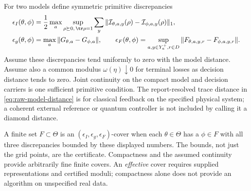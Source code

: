For two models define symmetric primitive discrepancies
\begin{align}
 \epsilon_I(\theta,\phi)
 &=\frac12\max_a\sup_{\rho\succeq0,\,\tr\rho=1}
       \sum_y\|\mathcal I_{\theta,a,y}(\rho)
                    -\mathcal I_{\phi,a,y}(\rho)\|_1,\label{eq:raw-model-distance}\\
 \epsilon_g(\theta,\phi)&=\max_a\|G_{\theta,a}-G_{\phi,a}\|,\qquad
 \epsilon_F(\theta,\phi)=\sup_{a,y\in Y_a^+,r\in D}
                 \|F_{\theta,a,y,r}-F_{\phi,a,y,r}\|.\nonumber
\end{align}
Assume these discrepancies tend uniformly to zero with the model distance. Assume also a common modulus $\omega(\eta)\downarrow0$ for terminal losses as decision distance tends to zero. Joint continuity on the compact model and decision carriers is one sufficient primitive condition. The report-resolved trace distance in \eqref{eq:raw-model-distance} is for classical feedback on the specified physical system; a coherent external reference or quantum controller is not included by calling it a diamond distance.

A finite set $F\subset\Theta$ is an $(\epsilon_I,\epsilon_g,\epsilon_F)$-cover when each $\theta\in\Theta$ has a $\phi\in F$ with all three discrepancies bounded by these displayed numbers. The bounds, not just the grid points, are the certificate. Compactness and the assumed continuity provide arbitrarily fine finite covers. An \emph{effective} cover requires supplied representations and certified moduli; compactness alone does not provide an algorithm on unspecified real data.

